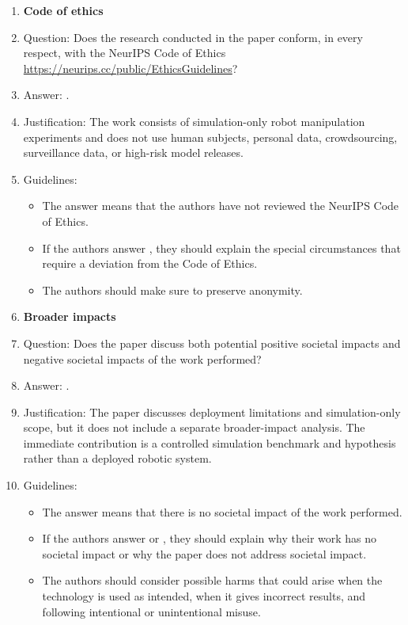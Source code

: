 \begin{enumerate}
\item {\bf Code of ethics}
    \item[] Question: Does the research conducted in the paper conform, in every respect, with the NeurIPS Code of Ethics \url{https://neurips.cc/public/EthicsGuidelines}?
    \item[] Answer: \answerYes{}.
    \item[] Justification: The work consists of simulation-only robot manipulation experiments and does not use human subjects, personal data, crowdsourcing, surveillance data, or high-risk model releases.
    \item[] Guidelines:
    \begin{itemize}
        \item The answer \answerNA{} means that the authors have not reviewed the NeurIPS Code of Ethics.
        \item If the authors answer \answerNo{}, they should explain the special circumstances that require a deviation from the Code of Ethics.
        \item The authors should make sure to preserve anonymity.
    \end{itemize}

\item {\bf Broader impacts}
    \item[] Question: Does the paper discuss both potential positive societal impacts and negative societal impacts of the work performed?
    \item[] Answer: \answerNo{}.
    \item[] Justification: The paper discusses deployment limitations and simulation-only scope, but it does not include a separate broader-impact analysis. The immediate contribution is a controlled simulation benchmark and hypothesis rather than a deployed robotic system.
    \item[] Guidelines:
    \begin{itemize}
        \item The answer \answerNA{} means that there is no societal impact of the work performed.
        \item If the authors answer \answerNA{} or \answerNo{}, they should explain why their work has no societal impact or why the paper does not address societal impact.
        \item The authors should consider possible harms that could arise when the technology is used as intended, when it gives incorrect results, and following intentional or unintentional misuse.
    \end{itemize}


\end{enumerate}
